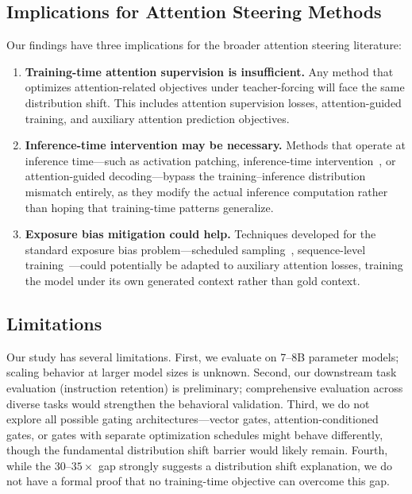 \documentclass[11pt,a4paper]{article}
\begin{document}
\subsection{Implications for Attention Steering Methods}

Our findings have three implications for the broader attention steering literature:

\begin{enumerate}
    \item \textbf{Training-time attention supervision is insufficient.} Any method that optimizes attention-related objectives under teacher-forcing will face the same distribution shift. This includes attention supervision losses, attention-guided training, and auxiliary attention prediction objectives.

    \item \textbf{Inference-time intervention may be necessary.} Methods that operate at inference time---such as activation patching, inference-time intervention~\cite{li2024inference}, or attention-guided decoding---bypass the training--inference distribution mismatch entirely, as they modify the actual inference computation rather than hoping that training-time patterns generalize.

    \item \textbf{Exposure bias mitigation could help.} Techniques developed for the standard exposure bias problem---scheduled sampling~\cite{bengio2015scheduled}, sequence-level training~\cite{ranzato2016sequence}---could potentially be adapted to auxiliary attention losses, training the model under its own generated context rather than gold context.
\end{enumerate}

\subsection{Limitations}

Our study has several limitations.
First, we evaluate on 7--8B parameter models; scaling behavior at larger model sizes is unknown.
Second, our downstream task evaluation (instruction retention) is preliminary; comprehensive evaluation across diverse tasks would strengthen the behavioral validation.
Third, we do not explore all possible gating architectures---vector gates, attention-conditioned gates, or gates with separate optimization schedules might behave differently, though the fundamental distribution shift barrier would likely remain.
Fourth, while the $30$--$35\times$ gap strongly suggests a distribution shift explanation, we do not have a formal proof that no training-time objective can overcome this gap.
\end{document}
